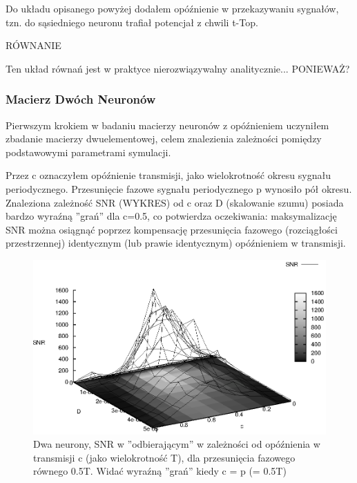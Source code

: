   Do układu opisanego powyżej dodałem opóźnienie w przekazywaniu sygnałów, tzn. do sąsiedniego neuronu trafiał potencjał z chwili t-Top.
  
  RÓWNANIE
  
  Ten układ równań jest w praktyce nierozwiązywalny analitycznie... PONIEWAŻ?
  
  \subsubsection{Macierz Dwóch Neuronów}

  Pierwszym krokiem w badaniu macierzy neuronów z opóźnieniem uczyniłem zbadanie macierzy dwuelementowej, celem znalezienia zależności pomiędzy podstawowymi parametrami symulacji.

  Przez c oznaczyłem opóźnienie transmisji, jako wielokrotność okresu sygnału periodycznego. Przesunięcie fazowe sygnału periodycznego p wynosiło pół okresu.
  Znaleziona zależność SNR (WYKRES) od c oraz D (skalowanie szumu) posiada bardzo wyraźną ''grań'' dla c=0.5, co potwierdza oczekiwania: maksymalizację SNR można osiągnąć poprzez kompensację przesunięcia fazowego (rozciągłości przestrzennej) identycznym (lub prawie identycznym) opóźnieniem w transmisji.

  \begin{figure}
    \includegraphics[width=140mm]{images/2neuron/3d}
    \caption{Dwa neurony, SNR w ''odbierającym'' w zależności od opóźnienia w transmisji c (jako wielokrotność T), dla przesunięcia fazowego równego 0.5T. Widać wyraźną ''grań'' kiedy c = p (= 0.5T)}
    \label{snr_c_d_3d}
  \end{figure}


